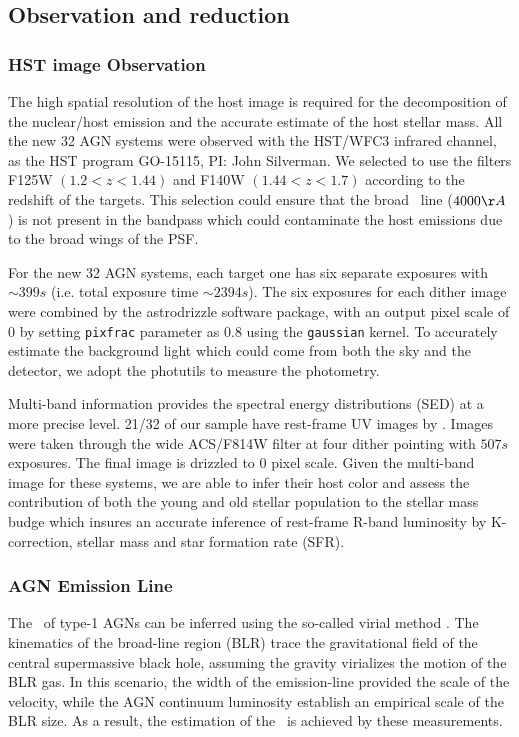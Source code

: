 \documentclass[apj]{emulateapj}
\begin{document}
\subsection{Observation and reduction}
\label{observation}
\subsubsection{HST image Observation}
The high spatial resolution of the host image is required for the decomposition of the nuclear/host emission and the accurate estimate of the host stellar mass. All the new 32 AGN systems were observed with the HST/WFC3 infrared channel, as the HST program GO-15115, PI: John Silverman. We selected to use the filters F125W $(1.2<z<1.44)$ and F140W $(1.44<z<1.7)$ according to the redshift of the targets. This selection could ensure that the broad \halpha\ line ($4000\AA$) is not present in the bandpass which could contaminate the host emissions due to the broad wings of the PSF.

For the new 32 AGN systems, each target one has six separate exposures with $\sim399s$ (i.e. total exposure time $\sim2394s$). The six exposures for each dither image were combined by the {\sc astrodrizzle} software package, with an output pixel scale of 0 by setting \texttt{pixfrac} parameter as 0.8 using the \texttt{gaussian} kernel. 
To accurately estimate the background light which could come from both the sky and the detector, we adopt the {\sc photutils} to measure the photometry.

Multi-band information provides the spectral energy distributions (SED) at a more precise level. 21/32 of our sample have rest-frame UV images by \citet{Scoville2007}. Images were taken through the wide ACS/F814W filter at four dither pointing with $507s$ exposures. The final image is drizzled to 0 pixel scale. Given the multi-band image for these systems, we are able to infer their host color and assess the contribution of both the young and old stellar population to the stellar mass budge \citet{Gallazzi2009} which insures an accurate inference of rest-frame R-band luminosity by K-correction, stellar mass and star formation rate (SFR). 

\subsubsection{AGN Emission Line}
\label{sec:bh_mass}
The \mbh\ of type-1 AGNs can be inferred using the so-called virial method \citep{Peterson2004, Shen2013}. The kinematics of the broad-line region (BLR) trace the gravitational field of the central supermassive black hole, assuming the gravity virializes the motion of the BLR gas. In this scenario, the width of the emission-line provided the scale of the velocity, while the AGN continuum luminosity establish an empirical scale of the BLR size. As a result, the estimation of the \mbh\ is achieved by these measurements.
\end{document}

